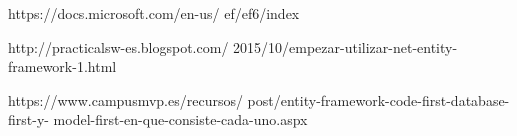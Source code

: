 \documentclass[twoside,twocolumn]{article}
\begin{document}
\begin{flushright}
\begin{itemize}
\begin{thebibliography}{99}
https://docs.microsoft.com/en-us/
ef/ef6/index


http://practicalsw-es.blogspot.com/
2015/10/empezar-utilizar-net-entity-
framework-1.html


https://www.campusmvp.es/recursos/
post/entity-framework-code-first-database-first-y-
model-first-en-que-consiste-cada-uno.aspx

\newblock {\em }
 
\end{thebibliography}

\end{itemize}
\end{flushright}
\end{document}
